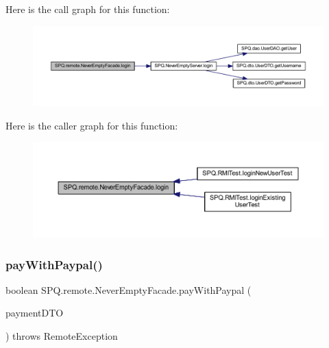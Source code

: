 Here is the call graph for this function\+:\nopagebreak
\begin{figure}[H]
\begin{center}
\leavevmode
\includegraphics[width=350pt]{class_s_p_q_1_1remote_1_1_never_empty_facade_a3fdd96efa1256ea520a497b8a20578e8_cgraph}
\end{center}
\end{figure}
Here is the caller graph for this function\+:\nopagebreak
\begin{figure}[H]
\begin{center}
\leavevmode
\includegraphics[width=350pt]{class_s_p_q_1_1remote_1_1_never_empty_facade_a3fdd96efa1256ea520a497b8a20578e8_icgraph}
\end{center}
\end{figure}
\mbox{\label{class_s_p_q_1_1remote_1_1_never_empty_facade_a9942c7930b5144f0677dc0fdcde25cc3}} 
\subsubsection{\texorpdfstring{pay\+With\+Paypal()}{payWithPaypal()}}
{\footnotesize\ttfamily boolean S\+P\+Q.\+remote.\+Never\+Empty\+Facade.\+pay\+With\+Paypal (\begin{DoxyParamCaption}\item[{\mbox{\hyperlink{class_s_p_q_1_1dto_1_1_payment_d_t_o}{Payment\+D\+TO}}}]{payment\+D\+TO }\end{DoxyParamCaption}) throws Remote\+Exception}



